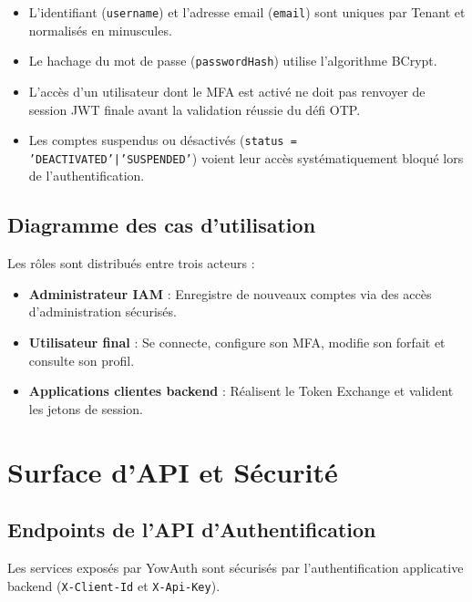 \documentclass[11pt,a4paper,oneside]{report}
\newcommand{\code}[1]{\texttt{\small #1}}
\begin{document}
\begin{invbox}
\begin{itemize}
  \item L'identifiant (\code{username}) et l'adresse email (\code{email}) sont uniques par Tenant et normalisés en minuscules.
  \item Le hachage du mot de passe (\code{passwordHash}) utilise l'algorithme BCrypt.
  \item L'accès d'un utilisateur dont le MFA est activé ne doit pas renvoyer de session JWT finale avant la validation réussie du défi OTP.
  \item Les comptes suspendus ou désactivés (\code{status = 'DEACTIVATED'|'SUSPENDED'}) voient leur accès systématiquement bloqué lors de l'authentification.
\end{itemize}
\end{invbox}

\section{Diagramme des cas d'utilisation}
Les rôles sont distribués entre trois acteurs :
\begin{itemize}
  \item \textbf{Administrateur IAM} : Enregistre de nouveaux comptes via des accès d'administration sécurisés.
  \item \textbf{Utilisateur final} : Se connecte, configure son MFA, modifie son forfait et consulte son profil.
  \item \textbf{Applications clientes backend} : Réalisent le Token Exchange et valident les jetons de session.
\end{itemize}

\chapter{Surface d'API et Sécurité}

\section{Endpoints de l'API d'Authentification}
Les services exposés par YowAuth sont sécurisés par l'authentification applicative backend (\code{X-Client-Id} et \code{X-Api-Key}).
\end{document}
